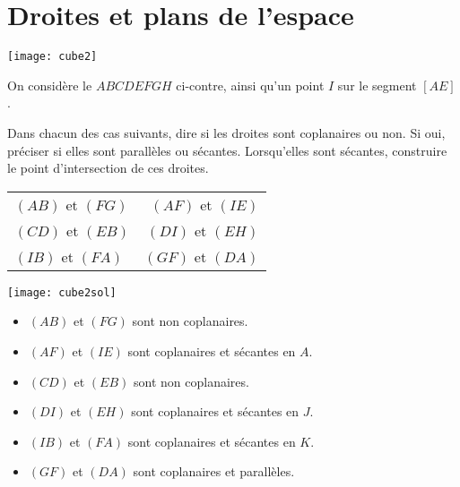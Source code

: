 \documentclass[11pt,fleqn, openany]{book} %
\begin{document}
\section*{Droites et plans de l'espace}

\begin{exercise}\hspace{0pt}

\begin{minipage}{0.4\linewidth}
\texttt{[image: cube2]}

\end{minipage}\hfill  \begin{minipage}{0.5 \linewidth}
On considère le $ABCDEFGH$ ci-contre, ainsi qu'un point $I$ sur le segment $[AE]$. 

Dans chacun des cas suivants, dire si les droites sont coplanaires ou non. Si oui, préciser si elles sont parallèles ou sécantes. Lorsqu'elles sont sécantes, construire le point d'intersection de ces droites.
\begin{center}
\begin{tabular}{lr}
 $(AB)$ et $(FG)$ & $(AF)$ et $(IE)$  \\
 $(CD)$ et $(EB)$ &  $(DI)$ et $(EH)$ \\
 $(IB)$ et $(FA)$ & $(GF)$ et $(DA)$
\end{tabular}
\end{center}\end{minipage}
\end{exercise}

\begin{solution}\hspace{0pt}

\begin{minipage}{0.3\linewidth}
\texttt{[image: cube2sol]}

\end{minipage}\hfill  \begin{minipage}{0.65 \linewidth}

\begin{itemize}
\item $(AB)$ et $(FG)$ sont non coplanaires.
\item  $(AF)$ et $(IE)$  sont coplanaires et sécantes en $A$.
\item $(CD)$ et $(EB)$ sont non coplanaires.
\item  $(DI)$ et $(EH)$ sont coplanaires et sécantes en $J$.
\item $(IB)$ et $(FA)$ sont coplanaires et sécantes en $K$.
\item $(GF)$ et $(DA)$ sont coplanaires et parallèles.
\end{itemize}
\end{minipage}
\end{solution}
\end{document}
